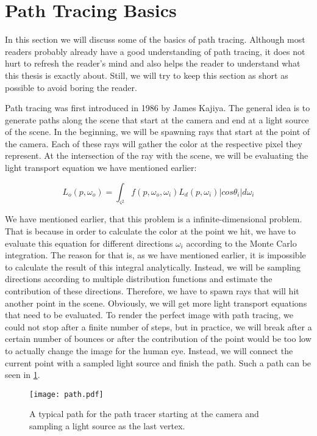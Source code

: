 \section{Path Tracing Basics}
\label{sec:preliminaries:pat}

In this section we will discuss some of the basics of path tracing. Although most readers probably already have a good understanding of path tracing, it does not hurt to refresh the reader's mind and also helps the reader to understand what this thesis is exactly about. Still, we will try to keep this section as short as possible to avoid boring the reader.

Path tracing was first introduced in 1986 by James Kajiya. The general idea is to generate paths along the scene that start at the camera and end at a light source of the scene. In the beginning, we will be spawning rays that start at the point of the camera. Each of these rays will gather the color at the respective pixel they represent. At the intersection of the ray with the scene, we will be evaluating the light transport equation we have mentioned earlier:

\begin{equation}
L_o(p, \omega_o) = \int_{\varsigma^2}f(p, \omega_o, \omega_i)L_d(p, \omega_i)|cos\theta_i|d\omega_i
\end{equation}

We have mentioned earlier, that this problem is a infinite-dimensional problem. That is because in order to calculate the color at the point we hit, we have to evaluate this equation for different directions $\omega_i$ according to the Monte Carlo integration. The reason for that is, as we have mentioned earlier, it is impossible to calculate the result of this integral analytically. Instead, we will be sampling directions according to multiple distribution functions and estimate the contribution of these directions. Therefore, we have to spawn rays that will hit another point in the scene. Obviously, we will get more light transport equations that need to be evaluated. To render the perfect image with path tracing, we could not stop after a finite number of steps, but in practice, we will break after a certain number of bounces or after the contribution of the point would be too low to actually change the image for the human eye. Instead, we will connect the current point with a sampled light source and finish the path. Such a path can be seen in \ref{fig:path}.

\begin{figure}
	\begin{center}
		\texttt{[image: path.pdf]}
		\caption{A typical path for the path tracer starting at the camera and sampling a light source as the last vertex.}
		\label{fig:path}
	\end{center}
\end{figure}

